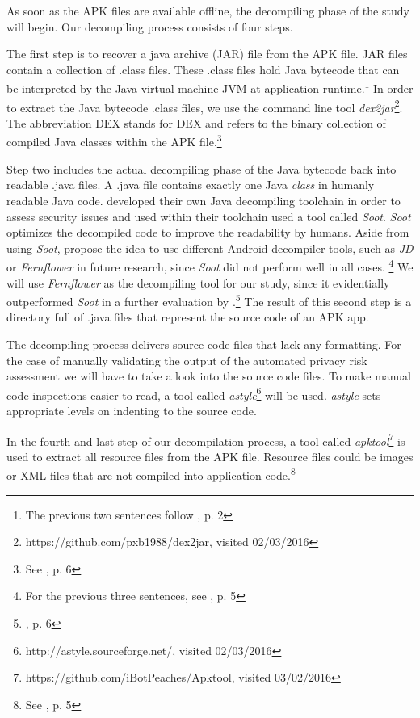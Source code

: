 \documentclass[
	a4paper,
	oneside,
	12pt,
	liststotocnumbered
]{article}
\let\cite\textcite
\begin{document}
As soon as the \acs{APK} files are available offline, the decompiling phase of the study will begin.
Our decompiling process consists of four steps.

The first step is to recover a java archive (\acs{JAR}) file from the \acs{APK} file.
\acs{JAR} files contain a collection of .class files. 
These .class files hold Java bytecode that can be interpreted by the Java virtual machine \acs{JVM} at application runtime.\footnote{The previous two sentences follow \cite{Enck2011}, p. 2} 
In order to extract the Java bytecode .class files, we use the command line tool \textit{dex2jar}\footnote{https://github.com/pxb1988/dex2jar, visited 02/03/2016}. 
The abbreviation \acs{DEX} stands for \acl{DEX} and refers to the binary collection of compiled Java classes within the \acs{APK} file.\footnote{See \cite{xu2013techniques}, p. 6}

Step two includes the actual decompiling phase of the Java bytecode back into readable .java files. 
A .java file contains exactly one Java \textit{class} in humanly readable Java code. 
\cite{Enck2011} developed their own Java decompiling toolchain in order to assess security issues and used within their toolchain used a tool called \textit{Soot}.
\textit{Soot} optimizes the decompiled code to improve the readability by humans.
Aside from using \textit{Soot}, \cite{Enck2011} propose the idea to use different Android decompiler tools, such as \textit{JD} or \textit{Fernflower} in future research, since \textit{Soot} did not perform well in all cases.  \footnote{For the previous three sentences, see \cite{Enck2011}, p. 5}
We will use \textit{Fernflower} as the decompiling tool for our study, since it evidentially outperformed \textit{Soot} in a further evaluation by \cite{Enck2011}.\footnote{\cite{Enck2011}, p. 6}
The result of this second step is a directory full of .java files that represent the source code of an \acs{APK} app.

The decompiling process delivers source code files that lack any formatting.
For the case of manually validating the output of the automated privacy risk assessment we will have to take a look into the source code files. 
To make manual code inspections easier to read, a tool called \textit{astyle}\footnote{http://astyle.sourceforge.net/, visited 02/03/2016} will be used. 
\textit{astyle} sets appropriate levels on indenting to the source code.

In the fourth and last step of our decompilation process, a tool called \textit{apktool}\footnote{https://github.com/iBotPeaches/Apktool, visited 03/02/2016} is used to extract all resource files from the \acs{APK} file. Resource files could be images or XML files that are not compiled into application code.\footnote{See \cite{xu2013techniques}, p. 5}
\end{document}
